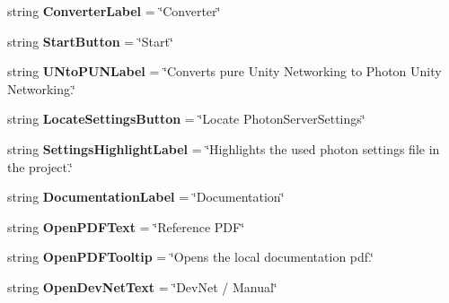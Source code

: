 \begin{DoxyCompactItemize}
\item 
string {\bfseries Converter\+Label} = \char`\"{}Converter\char`\"{}\hypertarget{class_pun_wizard_text_abcf53e463461d4e0d0828d904f75fb13}{}\label{class_pun_wizard_text_abcf53e463461d4e0d0828d904f75fb13}

\item 
string {\bfseries Start\+Button} = \char`\"{}Start\char`\"{}\hypertarget{class_pun_wizard_text_a69b56e0d631b99be36ca1fd0481c9af3}{}\label{class_pun_wizard_text_a69b56e0d631b99be36ca1fd0481c9af3}

\item 
string {\bfseries U\+Nto\+P\+U\+N\+Label} = \char`\"{}Converts pure Unity Networking to Photon Unity Networking.\char`\"{}\hypertarget{class_pun_wizard_text_a4b55e1319be8fbffe97ec49f0082a845}{}\label{class_pun_wizard_text_a4b55e1319be8fbffe97ec49f0082a845}

\item 
string {\bfseries Locate\+Settings\+Button} = \char`\"{}Locate Photon\+Server\+Settings\char`\"{}\hypertarget{class_pun_wizard_text_afac7dc3b8eb42ba802944f7ed7a0722f}{}\label{class_pun_wizard_text_afac7dc3b8eb42ba802944f7ed7a0722f}

\item 
string {\bfseries Settings\+Highlight\+Label} = \char`\"{}Highlights the used photon settings file in the project.\char`\"{}\hypertarget{class_pun_wizard_text_a5dc1c06f3b528de9f8f0fc826b188141}{}\label{class_pun_wizard_text_a5dc1c06f3b528de9f8f0fc826b188141}

\item 
string {\bfseries Documentation\+Label} = \char`\"{}Documentation\char`\"{}\hypertarget{class_pun_wizard_text_ae1dab9164063a1d996519de0d3c157d5}{}\label{class_pun_wizard_text_ae1dab9164063a1d996519de0d3c157d5}

\item 
string {\bfseries Open\+P\+D\+F\+Text} = \char`\"{}Reference P\+DF\char`\"{}\hypertarget{class_pun_wizard_text_aed4fa569a6a67715a4e87c1a9479c5e5}{}\label{class_pun_wizard_text_aed4fa569a6a67715a4e87c1a9479c5e5}

\item 
string {\bfseries Open\+P\+D\+F\+Tooltip} = \char`\"{}Opens the local documentation pdf.\char`\"{}\hypertarget{class_pun_wizard_text_a6bc9aad5c97f25fad71f4bf7fea36a44}{}\label{class_pun_wizard_text_a6bc9aad5c97f25fad71f4bf7fea36a44}

\item 
string {\bfseries Open\+Dev\+Net\+Text} = \char`\"{}Dev\+Net / Manual\char`\"{}\hypertarget{class_pun_wizard_text_a3e060bb7abfa48522c8acac07c86789f}{}\label{class_pun_wizard_text_a3e060bb7abfa48522c8acac07c86789f}


\end{DoxyCompactItemize}
